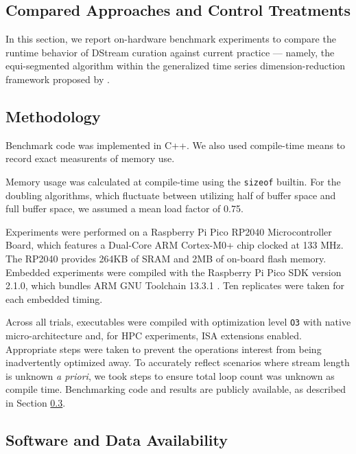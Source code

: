 \subsection{Compared Approaches and Control Treatments}



In this section, we report on-hardware benchmark experiments to compare the runtime behavior of DStream curation against current practice --- namely, the equi-segmented algorithm within the generalized time series dimension-reduction framework proposed by \citet{zhao2005generalized}.

\subsection{Methodology}
\label{sec:materials}

Benchmark code was implemented in C++.
We also used compile-time means to record exact measurents of memory use.

Memory usage was calculated at compile-time using the \texttt{sizeof} builtin.
For the doubling algorithms, which fluctuate between utilizing half of buffer space and full buffer space, we assumed a mean load factor of 0.75.

Experiments were performed on a Raspberry Pi Pico RP2040 Microcontroller Board, which features a Dual-Core ARM Cortex-M0+ chip clocked at 133 MHz.
The RP2040 provides 264KB of SRAM and 2MB of on-board flash memory.
Embedded experiments were compiled with the Raspberry Pi Pico SDK version 2.1.0, which bundles ARM GNU Toolchain 13.3.1 \citep{raspberrypipico2024}.
Ten replicates were taken for each embedded timing.

Across all trials, executables were compiled with optimization level \texttt{O3} with native micro-architecture and, for HPC experiments, ISA extensions enabled.
Appropriate steps were taken to prevent the operations interest from being inadvertently optimized away.
To accurately reflect scenarios where stream length is unknown \textit{a priori}, we took steps to ensure total loop count was unknown as compile time.
Benchmarking code and results are publicly available, as described in Section \ref{sec:materials}.

\subsection{Software and Data Availability}
\label{sec:materials}

